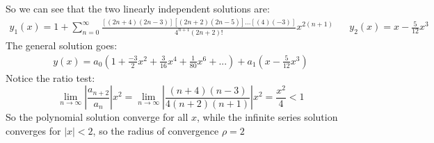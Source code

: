 \documentclass[12pt]{article}
\begin{document}
\\ \\
So we can see that the two linearly independent solutions are:
	\begin{align*}
	y_1(x) = 1 + \sum_{n=0}^{\infty} \frac{[(2n+4)(2n-3)][(2n+2)(2n-5)]...[(4)(-3)]}{4^{n+1}(2n+2)!}x^{2(n+1)}&& y_2(x) =  x - \frac{5}{12}x^3  
	\end{align*}
The general solution goes:
	\begin{align*}
		y(x) = a_0\left(1 + \frac{-3}{2}x^2 + \frac{3}{16}x^4 + \frac{1}{80}x^6 + ... \right) + a_1\left(x - \frac{5}{12}x^3\right)
	\end{align*}
Notice the ratio test:
	$$
	\lim\limits_{n \rightarrow \infty} \left|\frac{a_{n+2}}{a_n}\right|x^2 = \lim\limits_{n \rightarrow \infty} \left|\frac{(n+4)(n-3)}{4(n+2)(n+1)}\right|x^2 = \frac{x^2}{4} < 1
	$$
So the polynomial solution converge for all $x$, while the infinite series solution converges for $|x| < 2$, so the radius of convergence $\rho = 2$
	
\end{document}
